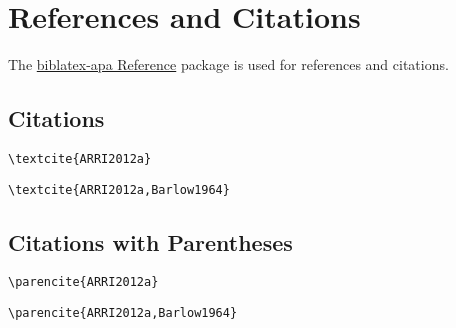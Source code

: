 \section*{References and Citations}

The \href{https://ctan.org/pkg/biblatex-apa}{biblatex-apa Reference}
package is used for references and citations.

\subsection*{Citations}

\begin{lstlisting}[caption={Citation for Single Author.}]
\textcite{ARRI2012a}
\end{lstlisting}

\textcite{ARRI2012a}

\begin{lstlisting}[caption={Citation for Multiple Authors.}]
\textcite{ARRI2012a,Barlow1964}
\end{lstlisting}

\textcite{ARRI2012a,Barlow1964}

\subsection*{Citations with Parentheses}

\begin{lstlisting}[caption={Citation with Parentheses for Single Author.}]
\parencite{ARRI2012a}
\end{lstlisting}

\parencite{ARRI2012a}

\begin{lstlisting}[caption={Citation with Parentheses for Multiple Authors.}s]
\parencite{ARRI2012a,Barlow1964}
\end{lstlisting}

\parencite{ARRI2012a,Barlow1964}
